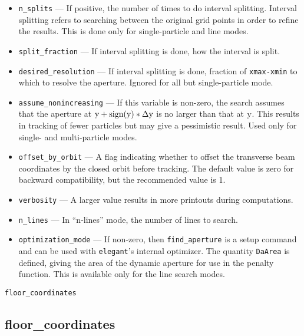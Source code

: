 \documentclass[11pt]{article}
\begin{document}
\begin{itemize}
\item \verb|n_splits| --- If positive, the number of times to do
interval splitting.  Interval splitting refers to searching between
the original grid points in order to refine the results.  This is done
only for single-particle and line modes.

\item \verb|split_fraction| --- If interval splitting is done, how the interval is split.

\item \verb|desired_resolution| --- If interval splitting is done,
fraction of \verb|xmax-xmin| to which to resolve the aperture.  Ignored for all but single-particle
mode.

\item \verb|assume_nonincreasing| --- If this variable is non-zero, the search assumes that the aperture
at ${\rm y+sign(y)*\Delta y}$ is no larger than that at ${\rm y}$.  This results in tracking of
fewer particles but may give a pessimistic result.    Used only for single- and multi-particle
modes.

\item \verb|offset_by_orbit| --- A flag indicating whether to offset
the transverse beam coordinates by the closed orbit before tracking.  The default value is
zero for backward compatibility, but the recommended value is 1.

\item \verb|verbosity| --- A larger value results in more printouts during computations.

\item \verb|n_lines| --- In ``n-lines'' mode, the number of lines to search.

\item \verb|optimization_mode| --- If non-zero, then \verb|find_aperture| is a setup command and can be used
with {\tt elegant}'s internal optimizer.  The quantity \verb|DaArea| is defined, giving the area of the dynamic
aperture for use in the penalty function.  This is available only for the line search modes.

\end{itemize}

\newpage
\begin{center}{\Large\verb|floor_coordinates|}\end{center}
\subsection{floor\_coordinates \label{subsec:floorcoordinates}}
\end{document}

